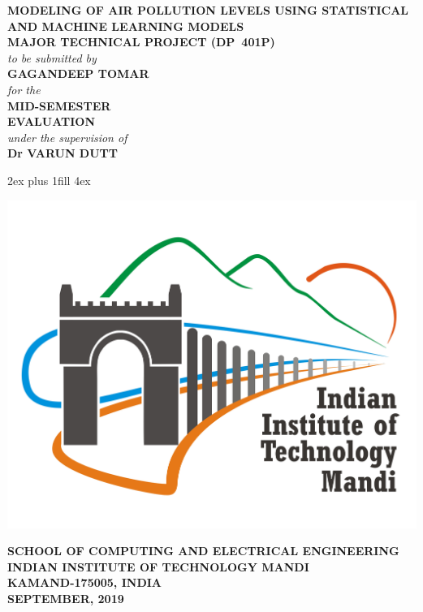 \thispagestyle{empty}
\setcounter{page}{0}
\vglue 0in
\begin{center}
	{\Large{\bf MODELING OF AIR POLLUTION LEVELS USING STATISTICAL AND MACHINE LEARNING MODELS}}\\[5ex]
	{\large{\bf MAJOR TECHNICAL PROJECT (DP~401P)}}\\[2ex]
	{\normalsize \em to be submitted by}\\[2ex]
	{\large{\bf GAGANDEEP TOMAR}}\\[2ex]
	{\normalsize \em for the}\\
	{\large{\bf MID-SEMESTER}}\\
	{\large{\bf EVALUATION}}\\[2ex]
	
	{\em under the supervision of}\\
	{\large {\bf  Dr VARUN DUTT}}
\end{center}

\vglue 2ex plus 1fill  %
\vglue 4ex
\centerline{\includegraphics[scale=0.6]{Images/logo_hires.jpg}}%

\begin{center}
	{\normalsize \bf SCHOOL OF COMPUTING AND ELECTRICAL ENGINEERING}\\[1ex]
	{\large \bf INDIAN INSTITUTE OF TECHNOLOGY MANDI}\\[1ex]
	{\large \bf KAMAND-175005, INDIA}\\[1ex]
	{\bf SEPTEMBER, 2019}
\end{center}

\clearpage
\thispagestyle{empty}
~\clearpage


